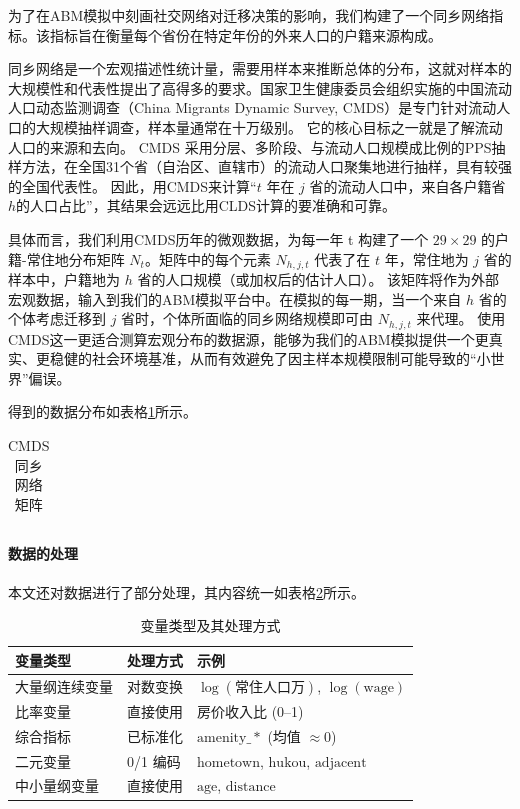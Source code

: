 \documentclass[master, final]{zufe-thesis}
\begin{document}
为了在ABM模拟中刻画社交网络对迁移决策的影响，我们构建了一个同乡网络指标。该指标旨在衡量每个省份在特定年份的外来人口的户籍来源构成。

同乡网络是一个宏观描述性统计量，需要用样本来推断总体的分布，这就对样本的大规模性和代表性提出了高得多的要求。国家卫生健康委员会组织实施的中国流动人口动态监测调查（China Migrants Dynamic Survey, CMDS）是专门针对流动人口的大规模抽样调查，样本量通常在十万级别。
它的核心目标之一就是了解流动人口的来源和去向。
CMDS 采用分层、多阶段、与流动人口规模成比例的PPS抽样方法，在全国31个省（自治区、直辖市）的流动人口聚集地进行抽样，具有较强的全国代表性。
因此，用CMDS来计算“$t$ 年在 $j$ 省的流动人口中，来自各户籍省$h$的人口占比”，其结果会远远比用CLDS计算的要准确和可靠。

具体而言，我们利用CMDS历年的微观数据，为每一年 t 构建了一个 $29 \times 29$ 的户籍-常住地分布矩阵 $N_t$。矩阵中的每个元素 $N_{h,j,t}$ 代表了在 $t$ 年，常住地为 $j$ 省的样本中，户籍地为 $h$ 省的人口规模（或加权后的估计人口）。
该矩阵将作为外部宏观数据，输入到我们的ABM模拟平台中。在模拟的每一期，当一个来自 $h$ 省的个体考虑迁移到 $j$ 省时，个体所面临的同乡网络规模即可由 $N_{h,j,t}$ 来代理。
使用CMDS这一更适合测算宏观分布的数据源，能够为我们的ABM模拟提供一个更真实、更稳健的社会环境基准，从而有效避免了因主样本规模限制可能导致的“小世界”偏误。

得到的数据分布如表格\ref{tab:CMDS同乡网络矩阵}所示。

\begin{table}[!ht]
\centering
\caption{CMDS同乡网络矩阵}
\begin{tabularx}{\textwidth}{@{}cXXX@{}}
\toprule
\midrule
\bottomrule
\end{tabularx}
\label{tab:CMDS同乡网络矩阵}
\end{table}





\paragraph{数据的处理}

本文还对数据进行了部分处理，其内容统一如表格\ref{tab:variable_processing}所示。

\begin{table}[htbp]
\centering
\caption{变量类型及其处理方式}
\label{tab:variable_processing}
\begin{tabular}{lll}
\toprule
变量类型 & 处理方式 & 示例 \\
\midrule
大量纲连续变量 & 对数变换 & $\log(\text{常住人口万})$, $\log(\text{wage})$ \\
比率变量 & 直接使用 & 房价收入比 (0--1) \\
综合指标 & 已标准化 & $\text{amenity}\_*$ (均值 $\approx 0$) \\
二元变量 & 0/1 编码 & $\text{hometown}$, $\text{hukou}$, $\text{adjacent}$ \\
中小量纲变量 & 直接使用 & $\text{age}$, $\text{distance}$ \\
\bottomrule
\end{tabular}
\end{table}
\end{document}
